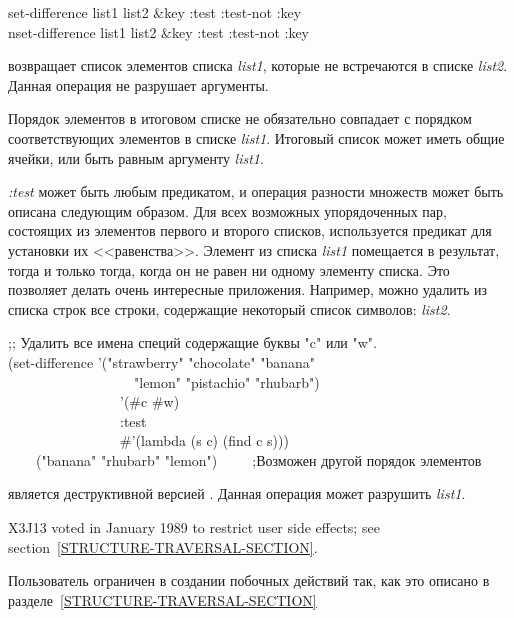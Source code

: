 \begin{defun}[Функция]
set-difference list1 list2 &key :test :test-not :key \\
nset-difference list1 list2 &key :test :test-not :key

 возвращает список элементов списка \emph{list1}, которые не
встречаются в списке \emph{list2}. Данная операция не разрушает аргументы.

Порядок элементов в итоговом списке не обязательно совпадает с порядком
соответствующих элементов в списке \emph{list1}.
Итоговый список может иметь общие ячейки, или быть равным  аргументу
\emph{list1}.

\emph{:test} может быть любым предикатом, и операция разности множеств может
быть описана следующим образом. Для всех возможных упорядоченных пар,
состоящих из элементов первого и второго списков, используется предикат для
установки их <<равенства>>. Элемент из списка \emph{list1} помещается в
результат, тогда и только тогда, когда он не равен ни одному элементу списка. Это
позволяет делать очень интересные приложения.
Например, можно удалить из списка строк все строки, содержащие некоторый список символов:
\emph{list2}.
\begin{lisp}
;; Удалить все имена специй содержащие буквы "c" или "w". \\
(set-difference '("strawberry" "chocolate" "banana" \\
~~~~~~~~~~~~~~~~~~"lemon" "pistachio" "rhubarb") \\
~~~~~~~~~~~~~~~~'(\#{\Xbackslash}c \#{\Xbackslash}w) \\
~~~~~~~~~~~~~~~~:test \\
~~~~~~~~~~~~~~~~\#'(lambda (s c) (find c s))) \\
~~~\EV\ ("banana" "rhubarb" "lemon")~~~~~;\textrm{Возможен другой порядок
  элементов}
\end{lisp}

 является деструктивной версией
. Данная операция может разрушить \emph{list1}.

\begin{new}
X3J13 voted in January 1989
to restrict user side effects; see section~\ref{STRUCTURE-TRAVERSAL-SECTION}.
\end{new}

Пользователь ограничен в создании побочных действий так, как это описано в
разделе~\ref{STRUCTURE-TRAVERSAL-SECTION}
\end{defun}

